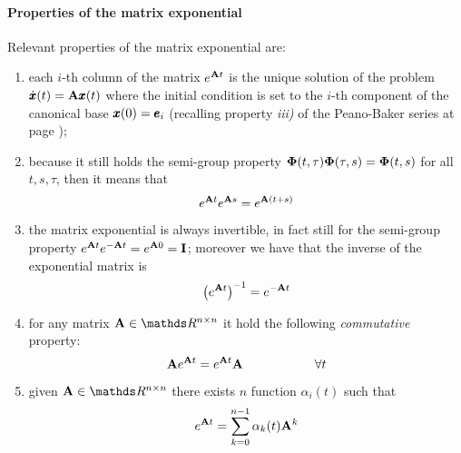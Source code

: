 	\paragraph{Properties of the matrix exponential} Relevant properties of the matrix exponential are:
	\begin{enumerate}[\itshape i)]
		\item each $i$-th column of the matrix $e^{\mathbf{A} t}$ is the unique solution of the problem $\dot{\pmb{x}}(t) = \mathbf{A} \pmb{x}(t)$ where the initial condition is set to the $i$-th component of the canonical base $\pmb{x}(0) = \pmb{e}_i$ (recalling property \textit{iii)} of the Peano-Baker series at page \pageref{eq:sol:statetransitionmatrix});
		
		\item because it still holds the semi-group property $\mathbf{\Phi}(t,\tau)\mathbf{\Phi}(\tau,s) = \mathbf{\Phi}(t,s)$ for all $t,s,\tau$, then it means that
		\[ e^{\mathbf{A} t} e^{\mathbf{A} s} = e^{\mathbf{A}(t+s)} \]
		
		\item the matrix exponential is always invertible, in fact still for the semi-group property $e^{\mathbf{A} t} e^{-\mathbf{A} t} = e^{\mathbf{A} 0} = \mathbf{I}$; moreover we have that the inverse of the exponential matrix is
		\[ \left( e^{\mathbf{A} t} \right)^{-1} = e^{-\mathbf{A} t} \]
		
		\item for any matrix $\A \in \mathds R^{n\times n}$ it hold the following \textit{commutative} property:
		\[ \mathbf{A} e^{\mathbf{A} t} = e^{\mathbf{A} t} \mathbf{A} \hspace{2cm} \forall t \]
		
		\item given $\A \in \mathds R^{n\times n}$ there exists $n$ function $\alpha_i(t)$ such that
		\[ e^{\mathbf{A} t} = \sum_{k=0}^{n-1} \alpha_k(t) \mathbf{A}^k \]
		
	\end{enumerate}

